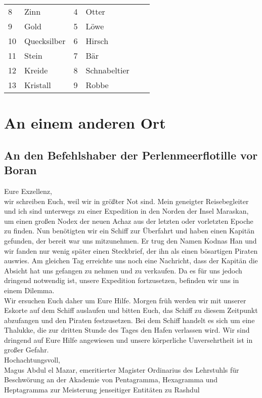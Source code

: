 \documentclass[final]{multiversum}
\begin{document}
\begin{table*}[!t]
\begin{framed}
\begin{tabular}{p{}p{}p{}p{}p{}p{}}
8             & Zinn                           & 4               & Otter                                       \\
9             & Gold                           & 5               & Löwe                                        \\
10            & Quecksilber                    & 6               & Hirsch                                      \\
11            & Stein                          & 7               & Bär                                         \\
12            & Kreide                         & 8               & Schnabeltier                                \\
13            & Kristall                       & 9               & Robbe                                       \\
\end{tabular}
\end{framed}
\end{table*}

\section{An einem anderen Ort}

\subsection{An den Befehlshaber der Perlenmeerflotille vor Boran}
Eure Exzellenz,\\
wir schreiben Euch, weil wir in größter Not sind.
Mein geneigter Reisebegleiter und ich sind unterwegs zu einer Expedition in den Norden der Insel Maraskan, um einen großen Nodex der neuen Achaz aus der letzten oder vorletzten Epoche zu finden.
Nun benötigten wir ein Schiff zur Überfahrt und haben einen Kapitän gefunden, der bereit war uns mitzunehmen.
Er trug den Namen Kodnas Han und wir fanden nur wenig später einen Steckbrief, der ihn als einen bösartigen Piraten auswies.
Am gleichen Tag erreichte uns noch eine Nachricht, dass der Kapitän die Absicht hat uns gefangen zu nehmen und zu verkaufen.
Da es für uns jedoch dringend notwendig ist, unsere Expedition fortzusetzen, befinden wir uns in einem Dilemma.\\
Wir ersuchen Euch daher um Eure Hilfe.
Morgen früh werden wir mit unserer Eskorte auf dem Schiff auslaufen und bitten Euch, das Schiff zu diesem Zeitpunkt abzufangen und den Piraten festzusetzen.
Bei dem Schiff handelt es sich um eine Thalukke, die zur dritten Stunde des Tages den Hafen verlassen wird.
Wir sind dringend auf Eure Hilfe angewiesen und unsere körperliche Unversehrtheit ist in großer Gefahr.\\
Hochachtungsvoll,\\
Magus Abdul el Mazar, emeritierter Magister Ordinarius des Lehrstuhls für Beschwörung an der Akademie von Pentagramma, Hexagramma und Heptagramma zur Meisterung jenseitiger Entitäten zu Rashdul
\end{document}
